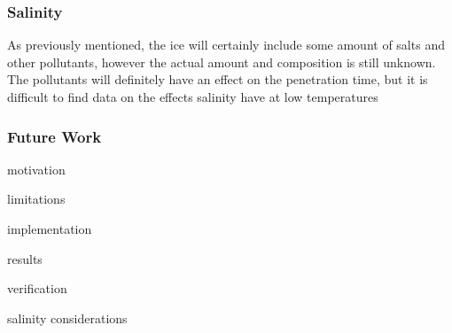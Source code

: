 \subsubsection{Salinity} \label{sec:iceSalinity}
As previously mentioned, the ice will certainly include some amount of salts and other pollutants, however the actual amount and composition is still unknown. The pollutants will definitely have an effect on the penetration time, but it is difficult to find data on the effects salinity have at low temperatures \cite{book:thomas2009sea}

\subsubsection{Future Work}

motivation 

limitations

implementation

results

verification

salinity considerations

